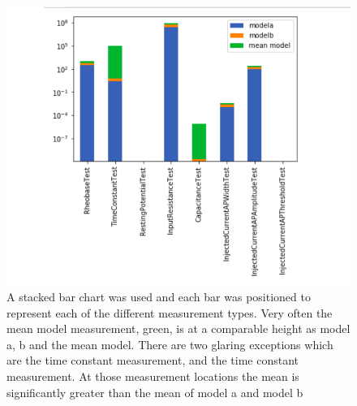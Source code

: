 
\begin{figure}
    \centering
    \includegraphics{figures/mean_model_mean_test2.png}
    \caption[bar charts that reveal disparity between mean model and mean measurement]{A stacked bar chart was used and each bar was positioned to represent each of the different measurement types. Very often the mean model measurement, green, is at a comparable height as model a, b and the mean model. There are two glaring exceptions which are the time constant measurement, and the time constant measurement. At those measurement locations the mean is significantly greater than the mean of model a and model b}
    \label{fig:my_label}
\end{figure}

